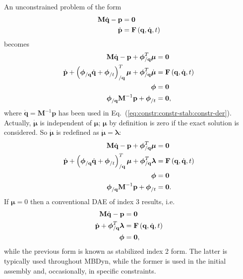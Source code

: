 \documentclass[10pt,dvips,fleqn,subeqn]{report}
\newcommand{\T}[1]{\bm{\mathbf{#1}}}
\newcommand{\TT}[1]{\bm{\mathbf{#1}}}
\begin{document}
An unconstrained problem of the form
\begin{subequations}
\begin{align}
	\T{M} \dot{\T{q}} - \T{p} &= \T{0} \\
	\dot{\T{p}} &= \T{F}\plbr{\T{q}, \dot{\T{q}}, t}
\end{align}
\end{subequations}
becomes
\begin{subequations}
\begin{align}
	\T{M} \dot{\T{q}} - \T{p} + \T{\phi}_{/\T{q}}^T \T{\mu} &= \T{0} \\
	\dot{\T{p}} + \plbr{
		\T{\phi}_{/\T{q}} \dot{\T{q}}
		+ \T{\phi}_{/t}
	}_{/\T{q}}^T \T{\mu}
	+ \T{\phi}_{/\T{q}}^T \dot{\T{\mu}} &= \T{F}\plbr{\T{q}, \dot{\T{q}}, t} \\
	\T{\phi} &= \T{0} \\
	\T{\phi}_{/\T{q}} \TT{M}^{-1} \T{p} + \T{\phi}_{/t} &= \T{0} \label{eq:constr:constr-stab:constr-der},
\end{align}
\end{subequations}
where $\dot{\T{q}}=\TT{M}^{-1}\T{p}$ has been used
in Eq.~(\ref{eq:constr:constr-stab:constr-der}).
Actually, $\dot{\T{\mu}}$ is independent of $\T{\mu}$;
$\T{\mu}$ by definition is zero if the exact solution is considered.
So $\dot{\T{\mu}}$ is redefined as $\dot{\T{\mu}}=\T{\lambda}$:
\begin{subequations}
\begin{align}
	\T{M} \dot{\T{q}} - \T{p} + \T{\phi}_{/\T{q}}^T \T{\mu} &= \T{0} \\
	\dot{\T{p}} + \plbr{
		\T{\phi}_{/\T{q}} \dot{\T{q}}
		+ \T{\phi}_{/t}
	}_{/\T{q}}^T \T{\mu} + \T{\phi}_{/\T{q}}^T \T{\lambda}
		&= \T{F}\plbr{\T{q}, \dot{\T{q}}, t} \\
	\T{\phi} &= \T{0} \\
	\T{\phi}_{/\T{q}} \TT{M}^{-1} \T{p} + \T{\phi}_{/t} &= \T{0} .
\end{align}
\end{subequations}
If $\T{\mu}=0$ then a conventional DAE of index 3 results, i.e.
\begin{subequations}
\begin{align}
	\T{M} \dot{\T{q}} - \T{p} &= \T{0} \\
	\dot{\T{p}} + \T{\phi}_{/\T{q}}^T \T{\lambda}
		&= \T{F}\plbr{\T{q}, \dot{\T{q}}, t} \\
	\T{\phi} &= \T{0} ,
\end{align}
\end{subequations}
while the previous form is known as stabilized index 2 form.
The latter is typically used throughout MBDyn, while the former is used 
in the initial assembly and, occasionally, in specific constraints.
\end{document}
